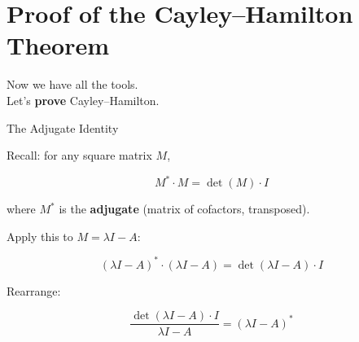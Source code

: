 \documentclass[10pt]{beamer}
\theoremstyle{definition}
\newcommand{\x}[1]{\alert{\textbf{#1}}}
\begin{document}
\section{Proof of the Cayley--Hamilton Theorem}


\begin{frame}{}
\vfill
\begin{center}
{\Large Now we have all the tools.\\[12pt]
Let's \x{prove} Cayley--Hamilton.}
\end{center}
\vfill
\end{frame}


\begin{frame}{The Adjugate Identity}

\vfill

Recall: for any square matrix $M$,

$$M^* \cdot M = \det(M) \cdot I$$

where $M^*$ is the \x{adjugate} (matrix of cofactors, transposed).

\vfill

Apply this to $M = \lambda I - A$:

$$(\lambda I - A)^{*} \cdot (\lambda I - A) = \det(\lambda I - A) \cdot I$$

\vfill

Rearrange:

$$\frac{\det(\lambda I - A) \cdot I}{\lambda I - A} = (\lambda I - A)^{*}$$

\vfill
\end{frame}
\end{document}
